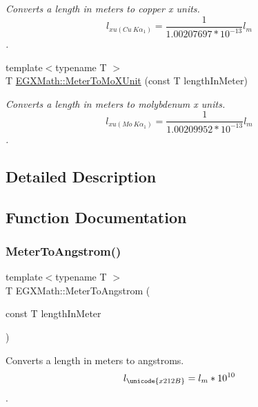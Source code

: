\begin{DoxyCompactItemize}
\begin{DoxyCompactList}\small\item\em Converts a length in meters to copper x units. \[ l_{xu(Cu\ K\alpha_1)}= \frac{1}{1.00207697*10^{-13}} l_{m} \]. \end{DoxyCompactList}\item 
{\footnotesize template$<$typename T $>$ }\\T \mbox{\hyperlink{group___e_g_x_math-_conversions-_length_conversions-_meter-_non-_s_i_gae0351200a3d90c4efe741c6057b2fd4b}{E\+G\+X\+Math\+::\+Meter\+To\+Mo\+X\+Unit}} (const T length\+In\+Meter)
\begin{DoxyCompactList}\small\item\em Converts a length in meters to molybdenum x units. \[ l_{xu(Mo\ K\alpha_1)}=\frac{1}{1.00209952*10^{-13}} l_{m} \]. \end{DoxyCompactList}\end{DoxyCompactItemize}


\subsection{Detailed Description}


\subsection{Function Documentation}
\mbox{\label{group___e_g_x_math-_conversions-_length_conversions-_meter-_non-_s_i_ga9e6d5040f58d167bd7a4b6cebb5527ee}} 
\subsubsection{\texorpdfstring{Meter\+To\+Angstrom()}{MeterToAngstrom()}}
{\footnotesize\ttfamily template$<$typename T $>$ \\
T E\+G\+X\+Math\+::\+Meter\+To\+Angstrom (\begin{DoxyParamCaption}\item[{const T}]{length\+In\+Meter }\end{DoxyParamCaption})}



Converts a length in meters to angstroms. \[ l_{\unicode{x212B}}=l_{m} * 10^{10} \]. 

